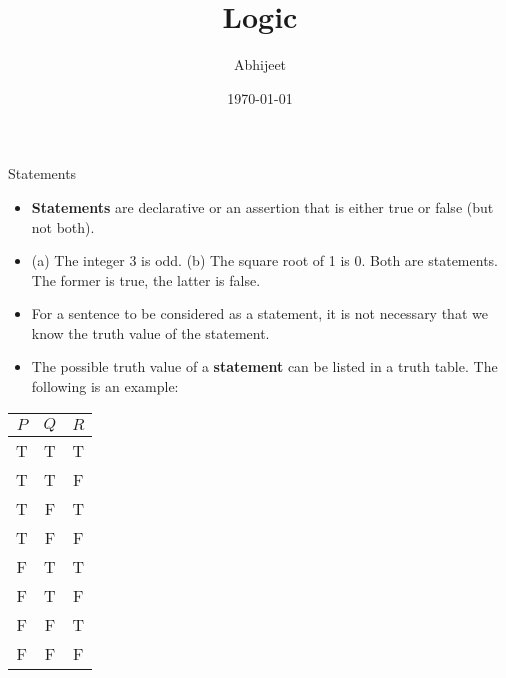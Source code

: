 \documentclass{beamer}
\title{Logic}
\author{Abhijeet}
\institute{IGIDR}
\date{\today}
\begin{document}
\begin{frame}[plain]
  \titlepage
\end{frame}

\begin{frame}{Statements}
\begin{itemize}
    \item \textbf{Statements} are declarative or an assertion that is either true or false (but not both). 
    \item (a) The integer 3 is odd. (b) The square root of 1 is 0. Both are statements. The former is true, the latter is false.
    \item For a sentence to be considered as a statement, it is not necessary that we know the truth value of the statement. 
    \item The possible truth value of a \textbf{statement} can be listed in a truth table. The following is an example: 
    
\end{itemize}
\begin{tabular}{|c|c|c|}
    \hline
    $P$ & $Q$ & $R$ \\
    \hline
    T & T & T \\
    T & T & F \\
    T & F & T \\
    T & F & F \\
    F & T & T \\
    F & T & F \\
    F & F & T \\
    F & F & F \\
    \hline
\end{tabular}
\end{frame}
\end{document}
